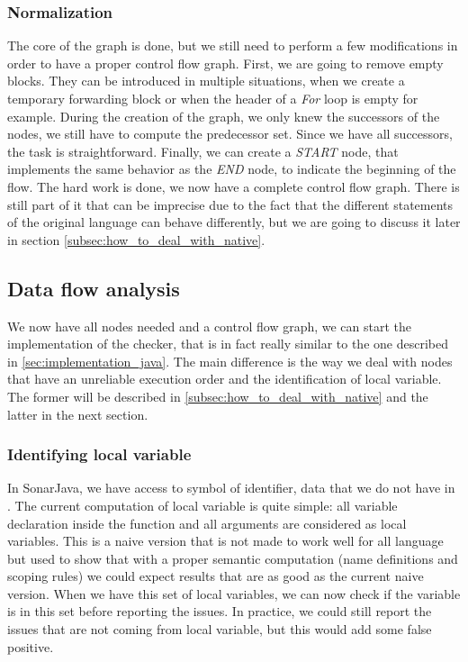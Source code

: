 \subsubsection{Normalization}
\label{subsubsec:normalization_cfg}
The core of the graph is done, but we still need to perform a few modifications in order to have a proper control flow graph. 
First, we are going to remove empty blocks. 
They can be introduced in multiple situations, when we create a temporary forwarding block or when the header of a \emph{For} loop is empty for example.
During the creation of the graph, we only knew the successors of the nodes, we still have to compute the predecessor set. 
Since we have all successors, the task is straightforward. 
Finally, we can create a \emph{START} node, that implements the same behavior as the \emph{END} node, to indicate the beginning of the flow. \newline
The hard work is done, we now have a complete control flow graph. 
There is still part of it that can be imprecise due to the fact that the different statements of the original language can behave differently, but we are going to discuss it later in section \ref{subsec:how_to_deal_with_native}.

\subsection{Data flow analysis}
\label{subsec:data_flow_analysis}

We now have all nodes needed and a control flow graph, we can start the implementation of the checker, that is in fact really similar to the one described in \ref{sec:implementation_java}. 
The main difference is the way we deal with nodes that have an unreliable execution order and the identification of local variable.
The former will be described in \ref{subsec:how_to_deal_with_native} and the latter in the next section.

\subsubsection{Identifying local variable}
\label{subsubsec:identifying_local_variable}

In SonarJava, we have access to symbol of identifier, data that we do not have in \slang{}. 
The current computation of local variable is quite simple: all variable declaration inside the function and all arguments are considered as local variables.
This is a naive version that is not made to work well for all language but used to show that with a proper semantic computation (name definitions and scoping rules) we could expect results that are as good as the current naive version. \newline
When we have this set of local variables, we can now check if the variable is in this set before reporting the issues. 
In practice, we could still report the issues that are not coming from local variable, but this would add some false positive.

